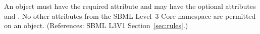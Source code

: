 An \AssignmentRule object must have the required attribute 
and may have the optional attributes   and .
No other attributes from the SBML Level~3 Core namespace are permitted on
an \AssignmentRule object.  (References: SBML L3V1
Section~\ref{sec:rules}.)
